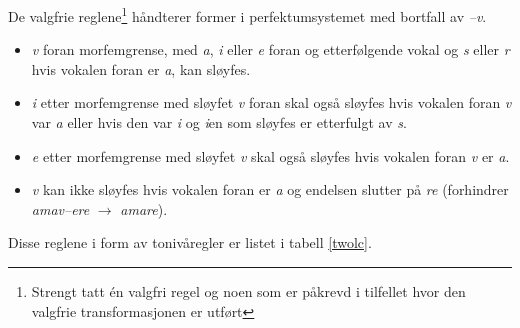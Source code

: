 \documentclass[a4paper]{article}
\begin{document}
De valgfrie reglene\footnote{Strengt tatt \'en valgfri regel og noen som er
p\aa{}krevd i tilfellet hvor den valgfrie transformasjonen er utf\o{}rt}
h\aa{}ndterer former i perfektumsystemet med bortfall av \emph{--v}.

\begin{itemize}
\item \emph{v} foran morfemgrense, med \emph{a}, \emph{i} eller \emph{e} foran
og etterf\o{}lgende vokal og \emph{s} eller \emph{r} hvis vokalen foran er
\emph{a}, kan sl\o{}yfes.

\item \emph{i} etter morfemgrense med sl\o{}yfet \emph{v} foran skal ogs\aa{}
sl\o{}yfes hvis vokalen foran \emph{v} var \emph{a} eller hvis den var
\emph{i} og \emph{i}en som sl\o{}yfes er etterfulgt av \emph{s}.

\item \emph{e} etter morfemgrense med sl\o{}yfet \emph{v} skal ogs\aa{}
sl\o{}yfes hvis vokalen foran \emph{v} er \emph{a}.

\item \emph{v} kan ikke sl\o{}yfes hvis vokalen foran er \emph{a} og endelsen
slutter p\aa{} \emph{re} (forhindrer \emph{amav--ere} $\to$ \emph{amare}).
\end{itemize}

Disse reglene i form av toniv\aa{}regler er listet i tabell \ref{twolc}.
\end{document}
